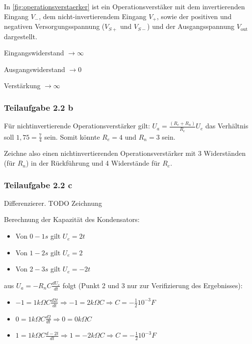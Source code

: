 \documentclass[a4paper]{scrartcl}
\begin{document}
  In \cref{fig:operationsverstaerker} ist ein Operationsverstäker mit dem
  invertierenden Eingang $V_{-}$, dem nicht-invertierendem Eingang $V_{+}$,
  sowie der positiven und negativen Versorgungsspannung ($V_{S+}$ und $V_{S-}$)
  und der Ausgangsspannung $V_{\text{out}}$ dargestellt.\\
  \begin{enumerate*}[label=(\roman*)]
      \item Eingangswiderstand $\rightarrow \infty$
      \item Ausgangswiderstand $\rightarrow 0$
      \item Verstärkung $\rightarrow \infty$
  \end{enumerate*}

  \subsubsection*{Teilaufgabe 2.2 b}
  Für nichtinvertierende Operationsverstärker gilt: $U_a = \frac{(R_e + R_n)}{R_e} U_e$
  das Verhältnis soll $1,75 = \frac{7}{4}$ sein. Somit könnte $R_e = 4$ und $R_n = 3$ sein.

  Zeichne also einen nichtinvertierenden Operationsverstärker mit 3 Widerständen (für $R_n$) in der Rückführung und 4 Widerstände für $R_e$.

  \subsubsection*{Teilaufgabe 2.2 c}
  Differenzierer. TODO Zeichnung
  
  Berechnung der Kapazität des Kondensators:
  \begin{itemize}
	\item Von $0 - 1s$ gilt $U_e = 2t$
	\item Von $1 - 2s$ gilt $U_e = 2$
	\item Von $2 - 3s$ gilt $U_e = -2t$  
  \end{itemize}
  
  aus $U_a = - R_n C \frac{d U_e}{dt}$ folgt (Punkt 2 und 3 nur zur Verifizierung des Ergebnisses):
  \begin{itemize}
  	\item $-1 = 1 k \Omega C \frac{d 2 t}{dt} \Rightarrow -1 = 2 k \Omega C \Rightarrow C = - \frac{1}{2} 10^{-3} F$
  	\item $0 = 1 k \Omega C \frac{d 2}{dt} \Rightarrow 0 = 0 k \Omega C$
  	\item $1 = 1 k \Omega C \frac{d -2 t}{dt} \Rightarrow 1 = -2 k \Omega C \Rightarrow C = - \frac{1}{2} 10^{-3} F$  	
  \end{itemize}
  
\end{document}
